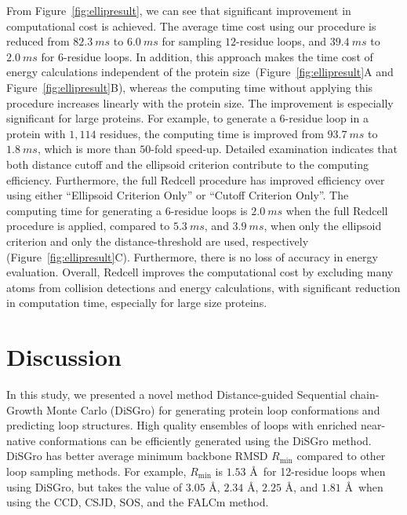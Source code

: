 From Figure~\ref{fig:ellipresult}, we can see that significant
improvement in computational cost is achieved. The average time cost
using our procedure is reduced from $82.3\:ms$ to $6.0\:ms$ for
sampling $12$-residue loops, and $39.4\:ms$ to $2.0\:ms$ for
$6$-residue loops. In addition, this approach makes the time cost of
energy calculations independent of the protein
size~(Figure~\ref{fig:ellipresult}A and
Figure~\ref{fig:ellipresult}B), whereas the computing time without
applying this procedure increases linearly with the protein size.
The improvement is especially significant for large proteins. For
example, to generate a $6$-residue loop in a protein with $1,114$
residues, the computing time is improved from $93.7\:ms$ to
$1.8\:ms$, which is more than $50$-fold speed-up. Detailed
examination indicates that both distance cutoff and the ellipsoid
criterion contribute to the computing efficiency. Furthermore, the
full {\sc Redcell} procedure has improved efficiency over using
either ``Ellipsoid Criterion Only'' or ``Cutoff Criterion Only''.
The computing time for generating a $6$-residue loops is $2.0\:ms$
when the full {\sc Redcell} procedure is applied, compared to
$5.3\:ms$, and $3.9\:ms$, when only the ellipsoid criterion and only
the distance-threshold are used, respectively
(Figure~\ref{fig:ellipresult}C). Furthermore, there is no loss of
accuracy in energy evaluation. Overall, {\sc Redcell} improves the
computational cost by excluding many atoms from collision detections
and energy calculations, with significant reduction in computation
time, especially for large size proteins.



\section*{Discussion}
In this study, we presented a novel method Distance-guided
Sequential chain-Growth Monte Carlo ({\sc DiSGro}) for generating
protein loop conformations and predicting loop structures. High
quality ensembles of loops with enriched near-native conformations
can be efficiently generated using the {\sc DiSGro} method. {\sc
DiSGro} has better average minimum backbone RMSD $R_{\min}$ compared
to other loop sampling methods. For example, $R_{\min}$ is $1.53$
\r{A}\ for 12-residue loops when using {\sc DiSGro}, but takes the
value of $3.05$ \r{A}, $2.34$ \r{A}, $2.25$ \r{A}, and $1.81$ \r{A}\
when using the CCD, CSJD, SOS, and the FALCm method.


